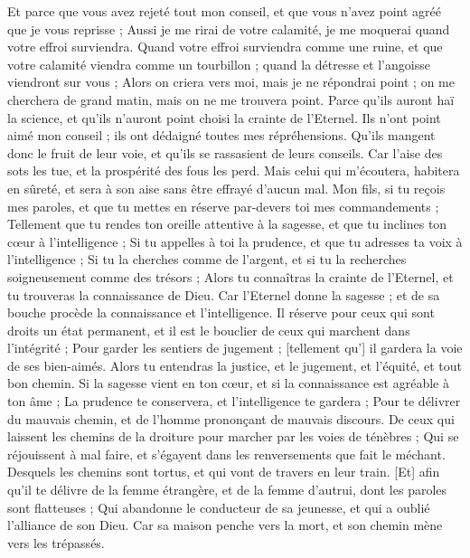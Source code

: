 \begin{multicols}{2}
Et parce que vous avez rejeté tout mon conseil, et que vous n'avez point agréé que je vous reprisse ;
Aussi je me rirai de votre calamité, je me moquerai quand votre effroi surviendra.
Quand votre effroi surviendra comme une ruine, et que votre calamité viendra comme un tourbillon ; quand la détresse et l'angoisse viendront sur vous ;
Alors on criera vers moi, mais je ne répondrai point ; on me cherchera de grand matin, mais on ne me trouvera point.
Parce qu'ils auront haï la science, et qu'ils n'auront point choisi la crainte de l'Eternel.
Ils n'ont point aimé mon conseil ; ils ont dédaigné toutes mes répréhensions.
Qu'ils mangent donc le fruit de leur voie, et qu'ils se rassasient de leurs conseils.
Car l'aise des sots les tue, et la prospérité des fous les perd.
Mais celui qui m'écoutera, habitera en sûreté, et sera à son aise sans être effrayé d'aucun mal.
\VerseOne{}Mon fils, si tu reçois mes paroles, et que tu mettes en réserve par-devers toi mes commandements ;
Tellement que tu rendes ton oreille attentive à la sagesse, et que tu inclines ton cœur à l'intelligence ;
Si tu appelles à toi la prudence, et que tu adresses ta voix à l'intelligence ;
Si tu la cherches comme de l'argent, et si tu la recherches soigneusement comme des trésors ;
Alors tu connaîtras la crainte de l'Eternel, et tu trouveras la connaissance de Dieu.
Car l'Eternel donne la sagesse ; et de sa bouche procède la connaissance et l'intelligence.
Il réserve pour ceux qui sont droits un état permanent, et il est le bouclier de ceux qui marchent dans l'intégrité ;
Pour garder les sentiers de jugement ; [tellement qu'] il gardera la voie de ses bien-aimés.
Alors tu entendras la justice, et le jugement, et l'équité, et tout bon chemin.
Si la sagesse vient en ton cœur, et si la connaissance est agréable à ton âme ;
La prudence te conservera, et l'intelligence te gardera ;
Pour te délivrer du mauvais chemin, et de l'homme prononçant de mauvais discours.
De ceux qui laissent les chemins de la droiture pour marcher par les voies de ténèbres ;
Qui se réjouissent à mal faire, et s'égayent dans les renversements que fait le méchant.
Desquels les chemins sont tortus, et qui vont de travers en leur train.
[Et] afin qu'il te délivre de la femme étrangère, et de la femme d'autrui, dont les paroles sont flatteuses ;
Qui abandonne le conducteur de sa jeunesse, et qui a oublié l'alliance de son Dieu.
Car sa maison penche vers la mort, et son chemin mène vers les trépassés.

\end{multicols}
